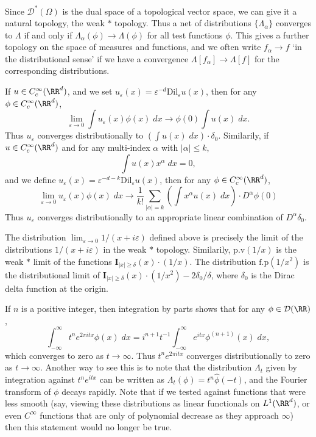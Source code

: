 Since $\mathcal{D}^*(\Omega)$ is the dual space of a topological vector space, we can give it a natural topology, the weak $*$ topology. Thus a net of distributions $\{ \Lambda_\alpha \}$ converges to $\Lambda$ if and only if $\Lambda_\alpha(\phi) \to \Lambda(\phi)$ for all test functions $\phi$. This gives a further topology on the space of measures and functions, and we often write $f_\alpha \to f$ `in the distributional sense' if we have a convergence $\Lambda[f_\alpha] \to \Lambda[f]$ for the corresponding distributions.

\begin{example}
    If $u \in C_c^\infty(\RR^d)$, and we set $u_\varepsilon(x) = \varepsilon^{-d} \text{Dil}_\varepsilon u(x)$, then for any $\phi \in C_c^\infty(\RR^d)$,
    \[ \lim_{\varepsilon \to 0} \int u_\varepsilon(x) \phi(x)\; dx \to \phi(0) \int u(x)\; dx. \]
    Thus $u_\varepsilon$ converges distributionally to $(\int u(x)\; dx) \cdot \delta_0$. Similarily, if $u \in C_c^\infty(\RR^d)$ and for any multi-index $\alpha$ with $|\alpha| \leq k$,
    \[ \int u(x) x^\alpha\; dx = 0, \]
    and we define $u_\varepsilon(x) = \varepsilon^{-d-k} \text{Dil}_\varepsilon u(x)$, then for any $\phi \in C_c^\infty(\RR^d)$,
    \[ \lim_{\varepsilon \to 0} u_\varepsilon(x) \phi(x)\; dx \to \frac{1}{k!} \sum_{|\alpha| = k} \left( \int x^\alpha u(x)\; dx \right) \cdot D^\alpha \phi(0) \]
    Thus $u_\varepsilon$ converges distributionally to an appropriate linear combination of $D^\alpha \delta_0$.
\end{example}

\begin{example}
    The distribution $\lim_{\varepsilon \to 0} 1/(x + i\varepsilon)$ defined above is precisely the limit of the distributions $1/(x + i \varepsilon)$ in the weak $*$ topology. Similarily, $\text{p.v}(1/x)$ is the weak $*$ limit of the functions $\mathbf{I}_{|x| \geq \delta}(x) \cdot (1/x)$. The distribution $\text{f.p}(1/x^2)$ is the distributional limit of $\mathbf{I}_{|x| \geq \delta}(x) \cdot (1/x^2) - 2 \delta_0 / \delta$, where $\delta_0$ is the Dirac delta function at the origin.
\end{example}

\begin{example}
    If $n$ is a positive integer, then integration by parts shows that for any $\phi \in \mathcal{D}(\RR)$,
    \[ \int_{-\infty}^\infty t^n e^{2 \pi itx} \phi(x)\; dx = i^{n+1} t^{-1} \int_{-\infty}^\infty e^{itx} \phi^{(n+1)}(x)\; dx, \]
    which converges to zero as $t \to \infty$. Thus $t^n e^{2 \pi itx}$ converges distributionally to zero as $t \to \infty$. Another way to see this is to note that the distribution $\Lambda_t$ given by integration against $t^n e^{itx}$ can be written as $\Lambda_t(\phi) = t^n \widehat{\phi}(-t)$, and the Fourier transform of $\phi$ decays rapidly. Note that if we tested against functions that were less smooth (say, viewing these distributions as linear functionals on $L^1(\RR^d)$, or even $C^\infty$ functions that are only of polynomial decrease as they approach $\infty$) then this statement would no longer be true.
\end{example}

